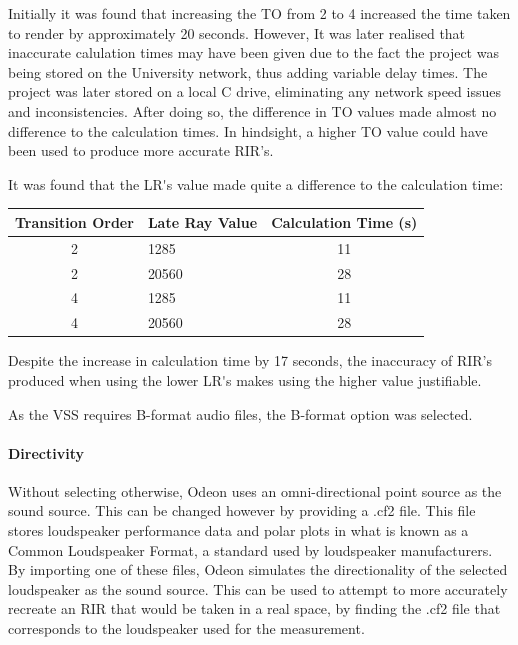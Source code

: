 \documentclass[../../main.tex]{subfiles}
\begin{document}
				Initially it was found that increasing the \ac{TO} from 2 to 4 increased the time taken to render by approximately 20 seconds. However, It was later realised that inaccurate calulation times may have been given due to the fact the project was being stored on the University network, thus adding variable delay times. The project was later stored on a local C drive, eliminating any network speed issues and inconsistencies. After doing so, the difference in \ac{TO} values made almost no difference to the calculation times. In hindsight, a higher \ac{TO} value could have been used to produce more accurate \ac{RIR}'s.

				It was found that the \ac{LR's} value made quite a difference to the calculation time:

				\begin{center}
					\begin{tabular}{c l c}
					\textbf{Transition Order} & \textbf{Late Ray Value} & \textbf{Calculation Time (s)} \\ \hline
					2 & 1285 & 11 \\
					2 & 20560 & 28 \\
					4 & 1285 & 11 \\
					4 & 20560 & 28 \\
					\end{tabular}
				\end{center}

				Despite the increase in calculation time by 17 seconds, the inaccuracy of \ac{RIR}'s produced when using the lower \ac{LR's} makes using the higher value justifiable.

				As the \ac{VSS} requires B-format audio files, the B-format option was selected.



			\paragraph{Directivity}

				Without selecting otherwise, Odeon uses an omni-directional point source as the sound source. This can be changed however by providing a .cf2 file. This file stores loudspeaker performance data and polar plots in what is known as a Common Loudspeaker Format, a standard used by loudspeaker manufacturers. By importing one of these files, Odeon simulates the directionality of the selected loudspeaker as the sound source. This can be used to attempt to more accurately recreate an \ac{RIR} that would be taken in a real space, by finding the .cf2 file that corresponds to the loudspeaker used for the measurement.
\end{document}
